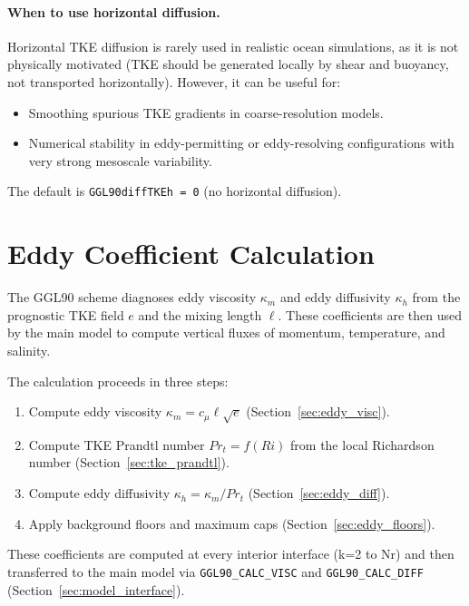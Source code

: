 \documentclass[12pt,letterpaper]{article}
\begin{document}
\paragraph{When to use horizontal diffusion.} Horizontal TKE diffusion is rarely used in realistic ocean simulations, as it is not physically motivated (TKE should be generated locally by shear and buoyancy, not transported horizontally). However, it can be useful for:
\begin{itemize}
\item Smoothing spurious TKE gradients in coarse-resolution models.
\item Numerical stability in eddy-permitting or eddy-resolving configurations with very strong mesoscale variability.
\end{itemize}

The default is \verb|GGL90diffTKEh = 0| (no horizontal diffusion).

\section{Eddy Coefficient Calculation}
\label{sec:eddy_coeffs}

The GGL90 scheme diagnoses eddy viscosity $\kappa_m$ and eddy diffusivity $\kappa_h$ from the prognostic TKE field $e$ and the mixing length $\ell$. These coefficients are then used by the main model to compute vertical fluxes of momentum, temperature, and salinity.

The calculation proceeds in three steps:
\begin{enumerate}
\item Compute eddy viscosity $\kappa_m = c_\mu \ell \sqrt{e}$ (Section~\ref{sec:eddy_visc}).
\item Compute TKE Prandtl number $Pr_t = f(Ri)$ from the local Richardson number (Section~\ref{sec:tke_prandtl}).
\item Compute eddy diffusivity $\kappa_h = \kappa_m / Pr_t$ (Section~\ref{sec:eddy_diff}).
\item Apply background floors and maximum caps (Section~\ref{sec:eddy_floors}).
\end{enumerate}

These coefficients are computed at every interior interface (k=2 to Nr) and then transferred to the main model via \verb|GGL90_CALC_VISC| and \verb|GGL90_CALC_DIFF| (Section~\ref{sec:model_interface}).
\end{document}
